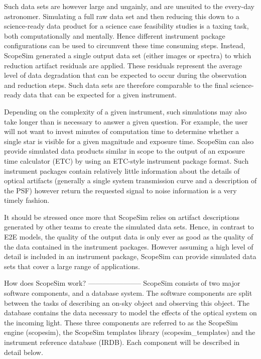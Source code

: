 Such data sets are however large and ungainly, and are unsuited to the every-day
astronomer. Simulating a full raw data set and then reducing this down to a
science-ready data product for a science case feasibility studies is a taxing
task, both computationally and mentally. Hence different instrument package
configurations can be used to circumvent these time consuming steps. Instead,
ScopeSim generated a single output data set (either images or spectra) to which
reduction artifact residuals are applied. These residuals represent the average
level of data degradation that can be expected to occur during the observation
and reduction steps. Such data sets are therefore comparable to the final
science-ready data that can be expected for a given instrument.

Depending on the complexity of a given instrument, such simulations may also
take longer than is necessary to answer a given question. For example, the user
will not want to invest minutes of computation time to determine whether a
single star is visible for a given magnitude and exposure time. ScopeSim can
also provide simulated data products similar in scope to the output of an
exposure time calculator (ETC) by using an ETC-style instrument package format.
Such instrument packages contain relatively little information about the details
of optical artifacts (generally a single system transmission curve and a
description of the PSF) however return the requested signal to noise information
is a very timely fashion.

It should be stressed once more that ScopeSim relies on artifact descriptions
generated by other teams to create the simulated data sets. Hence, in contrast
to E2E models, the quality of the output data is only ever as good as the
quality of the data contained in the instrument packages. However assuming a
high level of detail is included in an instrument package, ScopeSim can provide
simulated data sets that cover a large range of applications.


How does ScopeSim work?
-----------------------
ScopeSim consists of two major software components, and a database system. The
software components are split between the tasks of describing an on-sky object
and observing this object. The database contains the data necessary to model the
effects of the optical system on the incoming light. These three components are
referred to as the ScopeSim engine (scopesim), the ScopeSim templates library
(scopesim_templates) and the instrument reference database (IRDB). Each
component will be described in detail below.


